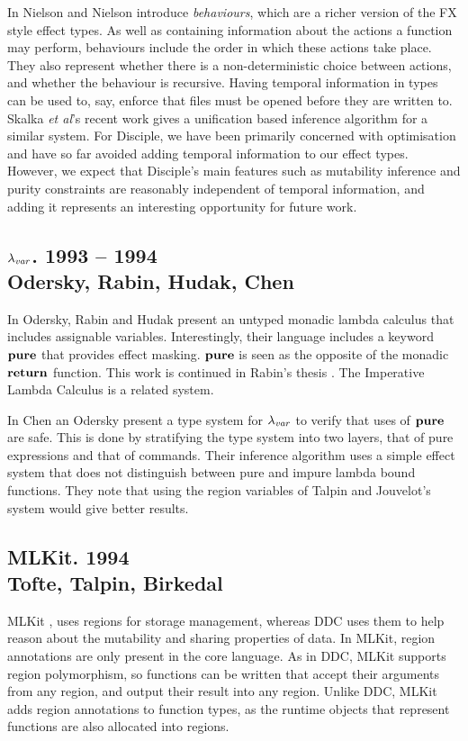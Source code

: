 In \cite{nielson:from-cml-to-its-process-algebra} Nielson and Nielson introduce \emph{behaviours}, which are a richer version of the FX style effect types. As well as containing information about the actions a function may perform, behaviours include the order in which these actions take place. They also represent whether there is a non-deterministic choice between actions, and whether the behaviour is recursive. Having temporal information in types can be used to, say, enforce that files must be opened before they are written to. Skalka \emph{et al}'s recent work \cite{skalka:trace-effects} gives a unification based inference algorithm for a similar system. For Disciple, we have been primarily concerned with optimisation and have so far avoided adding temporal information to our effect types. However, we expect that Disciple's main features such as mutability inference and purity constraints are reasonably independent of temporal information, and adding it represents an interesting opportunity for future work.


\subsection{$\lambda_{\operatorname{\mathit{var}}}$. 1993 -- 1994 \\ Odersky, Rabin, Hudak, Chen}
In \cite{odersky:lambda-var} Odersky, Rabin and Hudak present an untyped monadic lambda calculus that includes assignable variables. Interestingly, their language includes a keyword $\textrm{\textbf{pure}}$ that provides effect masking. $\textrm{\textbf{pure}}$ is seen as the opposite of the monadic $\textrm{\textbf{return}}$ function. This work is continued in Rabin's thesis \cite{rabin:functional-assignment}. The Imperative Lambda Calculus \cite{swarup:assignments-applicative, yang:ilc-revisited} is a related system. 

In \cite{chen:type-lambda-var} Chen an Odersky present a type system for $\lambda_{\operatorname{\mathit{var}}}$ to verify that uses of $\textrm{\textbf{pure}}$ are safe. This is done by stratifying the type system into two layers, that of pure expressions and that of commands. Their inference algorithm uses a simple effect system that does not distinguish between pure and impure lambda bound functions. They note that using the region variables of Talpin and Jouvelot's system \cite{talpin:polymorphic} would give better results. 


\subsection{MLKit. 1994 \\Tofte, Talpin, Birkedal}
MLKit \cite{tofte:mlkit-4.3.0}, uses regions for storage management, whereas DDC uses them to help reason about the mutability and sharing properties of data. In MLKit, region annotations are only present in the core language. As in DDC, MLKit supports region polymorphism, so functions can be written that accept their arguments from any region, and output their result into any region. Unlike DDC, MLKit adds region annotations to function types, as the runtime objects that represent functions are also allocated into regions. 

